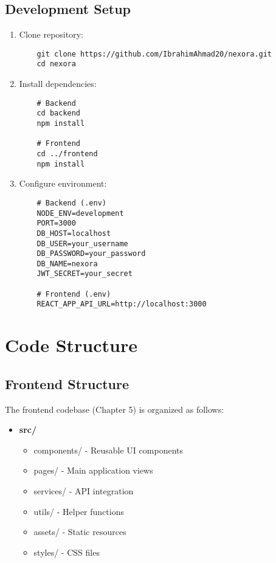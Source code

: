 \subsection{Development Setup}
\begin{enumerate}
    \item Clone repository:
    \begin{verbatim}
    git clone https://github.com/IbrahimAhmad20/nexora.git
    cd nexora
    \end{verbatim}
    
    \item Install dependencies:
    \begin{verbatim}
    # Backend
    cd backend
    npm install
    
    # Frontend
    cd ../frontend
    npm install
    \end{verbatim}
    
    \item Configure environment:
    \begin{verbatim}
    # Backend (.env)
    NODE_ENV=development
    PORT=3000
    DB_HOST=localhost
    DB_USER=your_username
    DB_PASSWORD=your_password
    DB_NAME=nexora
    JWT_SECRET=your_secret
    
    # Frontend (.env)
    REACT_APP_API_URL=http://localhost:3000
    \end{verbatim}
\end{enumerate}

\section{Code Structure}
\subsection{Frontend Structure}
The frontend codebase (Chapter 5) is organized as follows:
\begin{itemize}
    \item \textbf{src/}
    \begin{itemize}
        \item components/ - Reusable UI components
        \item pages/ - Main application views
        \item services/ - API integration
        \item utils/ - Helper functions
        \item assets/ - Static resources
        \item styles/ - CSS files
    \end{itemize}
\end{itemize}


